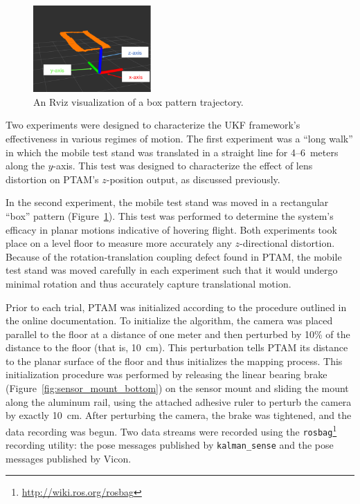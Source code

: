 \begin{figure}
  \centering
    \includegraphics[width=0.4\textwidth]{good_box_5_cropped}
  \caption[Rviz Visualization of a Box Pattern Trajectory]{An Rviz visualization of a box pattern trajectory.}
  \label{fig:good_box}
\end{figure}

Two experiments were designed to characterize the UKF framework's effectiveness in various regimes of motion. The first experiment was a ``long walk'' in which the mobile test stand was translated in a straight line for 4--6~meters along the $y$-axis. This test was designed to characterize the effect of lens distortion on PTAM's $z$-position output, as discussed previously.

In the second experiment, the mobile test stand was moved in a rectangular ``box'' pattern (Figure~\ref{fig:good_box}). This test was performed to determine the system's efficacy in planar motions indicative of hovering flight. Both experiments took place on a level floor to measure more accurately any $z$-directional distortion. Because of the rotation-translation coupling defect found in PTAM, the mobile test stand was moved carefully in each experiment such that it would undergo minimal rotation and thus accurately capture translational motion.

Prior to each trial, PTAM was initialized according to the procedure outlined in the online documentation. To initialize the algorithm, the camera was placed parallel to the floor at a distance of one meter and then perturbed by 10\% of the distance to the floor (that is, 10~cm). This perturbation tells PTAM its distance to the planar surface of the floor and thus initializes the mapping process. This initialization procedure was performed by releasing the linear bearing brake (Figure~\ref{fig:sensor_mount_bottom}) on the sensor mount and sliding the mount along the aluminum rail, using the attached adhesive ruler to perturb the camera by exactly 10~cm. After perturbing the camera, the brake was tightened, and the data recording was begun. Two data streams were recorded using the \texttt{rosbag}\footnote{\url{http://wiki.ros.org/rosbag}} recording utility: the pose messages published by \texttt{kalman\_sense} and the pose messages published by Vicon.

